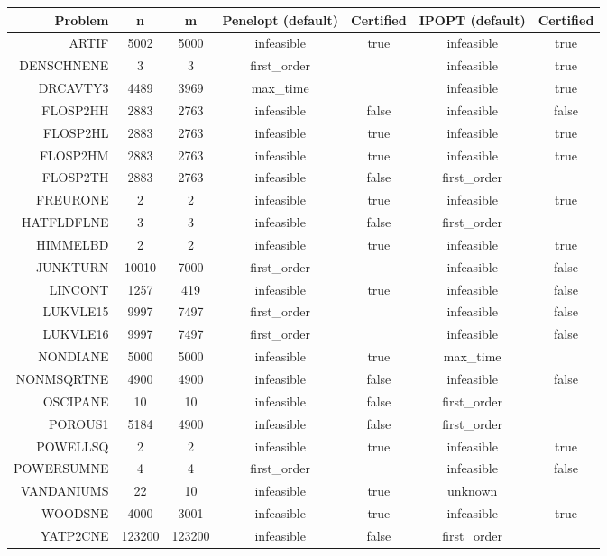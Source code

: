 \begin{tabular}{rcccccc}
  \hline
  \textbf{Problem} & \textbf{n} & \textbf{m} & \textbf{Penelopt (default)} & \textbf{Certified} & \textbf{IPOPT (default)} & \textbf{Certified} \\\hline
  ARTIF & 5002 & 5000 & infeasible & true & infeasible & true \\
  DENSCHNENE & 3 & 3 & first\_order &  & infeasible & true \\
  DRCAVTY3 & 4489 & 3969 & max\_time &  & infeasible & true \\
  FLOSP2HH & 2883 & 2763 & infeasible & false & infeasible & false \\
  FLOSP2HL & 2883 & 2763 & infeasible & true & infeasible & true \\
  FLOSP2HM & 2883 & 2763 & infeasible & true & infeasible & true \\
  FLOSP2TH & 2883 & 2763 & infeasible & false & first\_order &  \\
  FREURONE & 2 & 2 & infeasible & true & infeasible & true \\
  HATFLDFLNE & 3 & 3 & infeasible & false & first\_order &  \\
  HIMMELBD & 2 & 2 & infeasible & true & infeasible & true \\
  JUNKTURN & 10010 & 7000 & first\_order &  & infeasible & false \\
  LINCONT & 1257 & 419 & infeasible & true & infeasible & false \\
  LUKVLE15 & 9997 & 7497 & first\_order &  & infeasible & false \\
  LUKVLE16 & 9997 & 7497 & first\_order &  & infeasible & false \\
  NONDIANE & 5000 & 5000 & infeasible & true & max\_time &  \\
  NONMSQRTNE & 4900 & 4900 & infeasible & false & infeasible & false \\
  OSCIPANE & 10 & 10 & infeasible & false & first\_order &  \\
  POROUS1 & 5184 & 4900 & infeasible & false & first\_order &  \\
  POWELLSQ & 2 & 2 & infeasible & true & infeasible & true \\
  POWERSUMNE & 4 & 4 & first\_order &  & infeasible & false \\
  VANDANIUMS & 22 & 10 & infeasible & true & unknown &  \\
  WOODSNE & 4000 & 3001 & infeasible & true & infeasible & true \\
  YATP2CNE & 123200 & 123200 & infeasible & false & first\_order &  \\\hline
\end{tabular}
